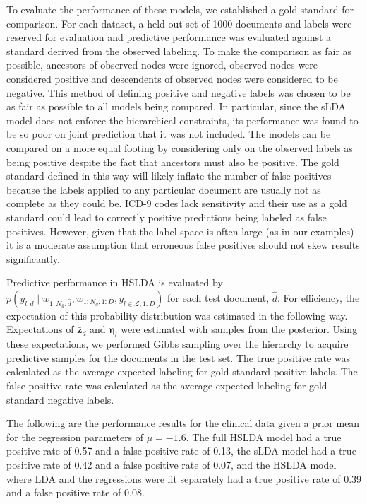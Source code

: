 To evaluate the performance of these models, we established a gold standard for comparison.
For each dataset, a held out set of 1000 documents and labels were
reserved for evaluation and predictive performance was evaluated against a standard derived
from the observed labeling. To make the comparison as fair as possible, 
ancestors of observed nodes were ignored, observed nodes 
were considered positive and descendents of observed nodes were considered to be negative. This method of 
defining positive and negative labels was chosen to be as fair as possible to all models
being compared.  In particular, since the sLDA model does not enforce the hierarchical
constraints, its performance was found to be so poor on joint prediction that it was not included.
The models can be compared on a more equal footing by considering only on the observed labels
as being positive despite the fact that ancestors must also be positive. The gold standard 
defined in this way will likely inflate the number of
false positives because the labels applied to any particular document are usually not as complete as they could be. 
ICD-9 codes lack sensitivity and their use as a
gold standard could lead to correctly positive predictions being labeled as false positives\citep{Birmetal2005}.
However, given that the label space is often large (as in our examples) it is a moderate assumption that
erroneous false positives should not skew results significantly.

Predictive performance in HSLDA is evaluated by $p\left(y_{l,\hat{d}}\mid w_{1:N_{\hat{d}},\hat{d}}, w_{1:N_d,1:D},  y_{l\in\mathcal{L},1:D}\right)$ 
for each test document, $\hat{d}$. For efficiency,
the expectation of this probability distribution was estimated in the following way. Expectations
of $\mathbf{\bar{z}}_d$ and $\boldsymbol{\eta}_l$ were estimated with samples from the posterior.
Using these expectations, we performed Gibbs sampling over the hierarchy to acquire predictive
samples for the documents in the test set. The true positive rate was calculated as the
 average expected labeling for gold standard positive labels. The false positive rate was calculated
as the average expected labeling for gold standard negative labels.

The following are the performance results for the clinical
data given a prior mean for the regression parameters of $\mu=-1.6$. 
The full HSLDA model had a true positive rate of 0.57 
and a false positive rate of 0.13, the sLDA model had a true positive
rate of 0.42 and a false positive rate of 0.07, and the HSLDA model where
LDA and the regressions were fit separately had a true positive rate of 0.39
and a false positive rate of 0.08.

